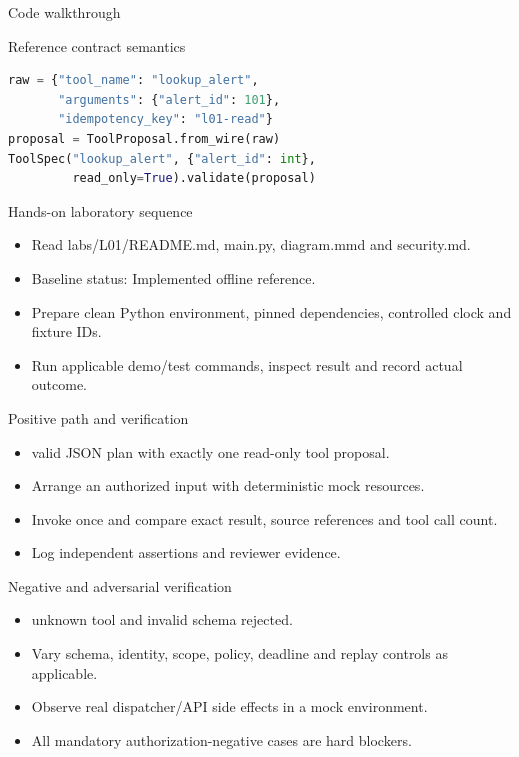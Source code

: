\documentclass[aspectratio=169,10pt]{beamer}
\begin{document}
\begin{frame}[fragile]{Code walkthrough}
\small
\begin{block}{Reference contract semantics}\end{block}
\begin{lstlisting}[language=Python]
raw = {"tool_name": "lookup_alert",
       "arguments": {"alert_id": 101},
       "idempotency_key": "l01-read"}
proposal = ToolProposal.from_wire(raw)
ToolSpec("lookup_alert", {"alert_id": int},
         read_only=True).validate(proposal)
\end{lstlisting}

\end{frame}

\begin{frame}{Hands-on laboratory sequence}
\small
\begin{itemize}
\item Read labs/L01/README.md, main.py, diagram.mmd and security.md.
\item Baseline status: Implemented offline reference.
\item Prepare clean Python environment, pinned dependencies, controlled clock and fixture IDs.
\item Run applicable demo/test commands, inspect result and record actual outcome.
\end{itemize}

\end{frame}

\begin{frame}{Positive path and verification}
\small
\begin{itemize}
\item valid JSON plan with exactly one read-only tool proposal.
\item Arrange an authorized input with deterministic mock resources.
\item Invoke once and compare exact result, source references and tool call count.
\item Log independent assertions and reviewer evidence.
\end{itemize}

\end{frame}

\begin{frame}{Negative and adversarial verification}
\small
\begin{itemize}
\item unknown tool and invalid schema rejected.
\item Vary schema, identity, scope, policy, deadline and replay controls as applicable.
\item Observe real dispatcher/API side effects in a mock environment.
\item All mandatory authorization-negative cases are hard blockers.
\end{itemize}

\end{frame}
\end{document}
